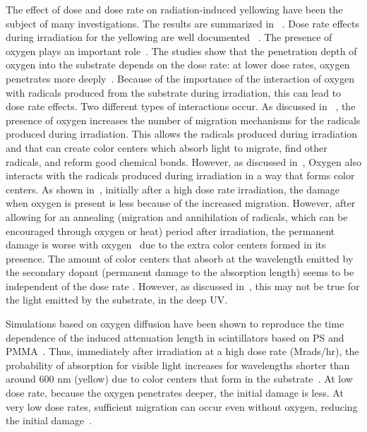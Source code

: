 \documentclass[review]{elsarticle}
\begin{document}
The effect of dose and dose rate on radiation-induced yellowing have been the subject of many investigations. The results are summarized in ~\cite{sauli}.  
Dose rate effects during irradiation for the yellowing are well documented  ~\cite{sauli,34504,Wick1991472,289295,173180,173178,Giokaris1993315,Wick2001341}.
The presence of oxygen plays an important role~\cite{bross19921199}.  
The studies show that the penetration depth of oxygen into the substrate
depends on the dose rate: at lower dose rates, oxygen penetrates
more deeply~\cite{Wick1991472}.
Because of the importance of the interaction
of oxygen with radicals produced from the substrate during irradiation, this can lead to dose rate effects. Two different types of interactions occur.
As discussed 
in ~\cite{Wulkop1995141}, the presence of oxygen
increases the number of migration mechanisms for the radicals produced during irradiation.  This allows the radicals produced during irradiation
and that can create color centers which absorb light 
to migrate, find other radicals, 
and reform good chemical bonds.
However, as discussed in~\cite{bross19921199}, Oxygen also 
interacts with the radicals produced during irradiation in a way
that forms color centers.  As shown in~\cite{bross19921199}, 
initially after a high dose rate irradiation, the damage when
oxygen is present is less because of the increased migration.  However,
after allowing for an annealing (migration and annihilation of radicals, which can be encouraged 
through oxygen or heat) period after irradiation, 
the permanent damage is worse with oxygen~\cite{bross19921199,zorn2}
due to the extra color centers formed in its presence.
The amount of color centers that absorb at the 
wavelength emitted by the secondary dopant (permanent damage to
the absorption length) seems to be independent of the
dose rate \cite{sauli}.
However, as discussed in~\cite{bross19921199}, this may not be true
for the light emitted by the substrate, in the deep UV.


Simulations based on oxygen diffusion have been shown
to reproduce the time dependence of the induced attenuation length in scintillators based on PS and PMMA~\cite{Wick2001341}.  
Thus, immediately after irradiation at a high dose rate (Mrads/hr), 
the probability of absorption for visible light increases for wavelengths shorter than around 600 nm (yellow) due to color centers that form in the substrate~\cite{Bross199135}.  At low dose rate, because the oxygen penetrates deeper,
the initial damage is less.  At very low dose rates, sufficient migration
can occur even without oxygen, reducing the initial damage~\cite{zorn2}.
\end{document}
